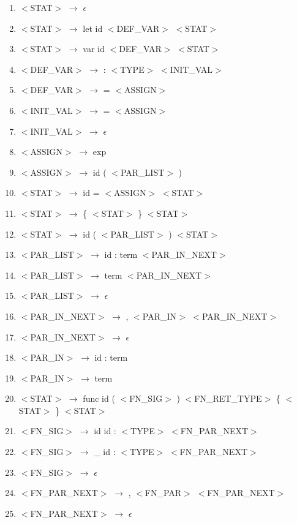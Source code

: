 \documentclass[a4paper,11pt]{article}
\begin{document}
\begin{enumerate}[itemsep=-0.2ex]
    \small
    \item $<$STAT$>$ $\rightarrow$ $\epsilon$
    \item $<$STAT$>$ $\rightarrow$ let id $<$DEF\_VAR$>$ $<$STAT$>$
    \item $<$STAT$>$ $\rightarrow$ var id $<$DEF\_VAR$>$ $<$STAT$>$
    \item $<$DEF\_VAR$>$ $\rightarrow$ : $<$TYPE$>$ $<$INIT\_VAL$>$
    \item $<$DEF\_VAR$>$ $\rightarrow$ = $<$ASSIGN$>$
    \item $<$INIT\_VAL$>$ $\rightarrow$ = $<$ASSIGN$>$
    \item $<$INIT\_VAL$>$ $\rightarrow$ $\epsilon$
    \item $<$ASSIGN$>$ $\rightarrow$ exp
    \item $<$ASSIGN$>$ $\rightarrow$ id ( $<$PAR\_LIST$>$ )
    \item $<$STAT$>$ $\rightarrow$ id = $<$ASSIGN$>$ $<$STAT$>$
    \item $<$STAT$>$ $\rightarrow$ \{ $<$STAT$>$ \} $<$STAT$>$
    \item $<$STAT$>$ $\rightarrow$ id ( $<$PAR\_LIST$>$ ) $<$STAT$>$
    \item $<$PAR\_LIST$>$ $\rightarrow$ id : term $<$PAR\_IN\_NEXT$>$
    \item $<$PAR\_LIST$>$ $\rightarrow$ term $<$PAR\_IN\_NEXT$>$
    \item $<$PAR\_LIST$>$ $\rightarrow$ $\epsilon$
    \item $<$PAR\_IN\_NEXT$>$ $\rightarrow$ , $<$PAR\_IN$>$ $<$PAR\_IN\_NEXT$>$
    \item $<$PAR\_IN\_NEXT$>$ $\rightarrow$ $\epsilon$
    \item $<$PAR\_IN$>$ $\rightarrow$ id : term
    \item $<$PAR\_IN$>$ $\rightarrow$ term
    \item $<$STAT$>$ $\rightarrow$ func id ( $<$FN\_SIG$>$ ) $<$FN\_RET\_TYPE$>$ \{ $<$STAT$>$ \} $<$STAT$>$
    \item $<$FN\_SIG$>$ $\rightarrow$ id id : $<$TYPE$>$ $<$FN\_PAR\_NEXT$>$
    \item $<$FN\_SIG$>$ $\rightarrow$ \_ id : $<$TYPE$>$ $<$FN\_PAR\_NEXT$>$
    \item $<$FN\_SIG$>$ $\rightarrow$ $\epsilon$
    \item $<$FN\_PAR\_NEXT$>$ $\rightarrow$ , $<$FN\_PAR$>$ $<$FN\_PAR\_NEXT$>$
    \item $<$FN\_PAR\_NEXT$>$ $\rightarrow$ $\epsilon$

\end{enumerate}
\end{document}
